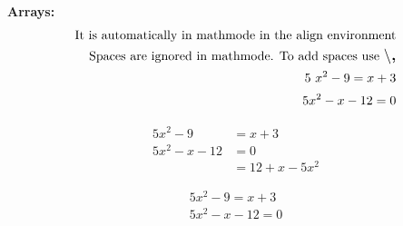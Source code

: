 \documentclass[11pt]{article}
\begin{document}
\lipsum[1]


\newpage







{\Large\bf Arrays:}
\begin{align} 
\text{It is automatically in mathmode in the align environment}\\
\text{Spaces are ignored in mathmode. To add spaces use \bf\large{$\backslash$,}}\\
5\,\,x^2-9=x+3\\
5x^2-x-12=0
\end{align}

\begin{align*}
5x^2-9&=x+3\\
5x^2-x-12&=0\\
         &=12+x-5x^2
\end{align*}

\begin{align}
5x^2-9=x+3\\
5x^2-x-12=0
\end{align}
\end{document}
